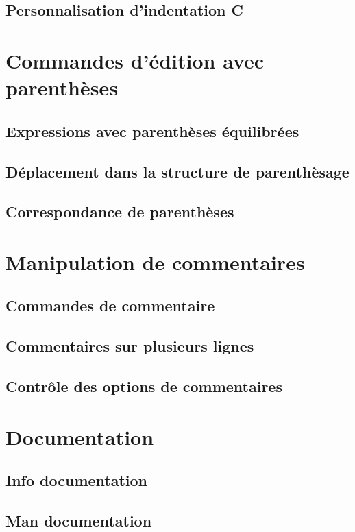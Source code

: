 \subsection{Personnalisation d'indentation C}\label{chap23sec3subsec5}
\section{Commandes d'édition avec parenthèses}\label{chap23sec4}
\subsection{Expressions avec parenthèses équilibrées}\label{chap23sec4subsec1}
\subsection{Déplacement dans la structure de
  parenthèsage}\label{chap23sec4subsec2} 
\subsection{Correspondance de parenthèses}\label{chap23sec4subsec3}
\section{Manipulation de commentaires}\label{chap23sec5}
\subsection{Commandes de commentaire}\label{chap23sec5subsec1}
\subsection{Commentaires sur plusieurs lignes}\label{chap23sec5subsec2}
\subsection{Contrôle des options de commentaires}\label{chap23sec5subsec3}
\section{Documentation}\label{chap23sec6}
\subsection{Info documentation}\label{chap23sec6subsec1}
\subsection{Man documentation}\label{chap23sec6subsec2}
